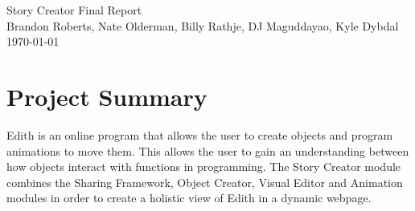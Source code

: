 \documentclass[12pt]{article}
\begin{document}

\begin{titlepage}
        \vspace*{\fill} %
        \begin{center}
                {\Huge Story Creator Final Report}\\ [0.5cm]        
                
                {\Large Brandon Roberts, Nate Olderman, Billy Rathje, DJ Maguddayao, Kyle Dybdal}\\[0.4cm]
                \today %
        \end{center}
        \vspace*{\fill}
\end{titlepage}

\section{Project Summary}
Edith is an online program that allows the user to create objects and program animations to move them. This allows the user to gain an understanding between how objects interact with functions in programming. The Story Creator module combines the Sharing Framework, Object Creator, Visual Editor and Animation modules in order to create a holistic view of Edith in a dynamic webpage. \\
\end{document}
